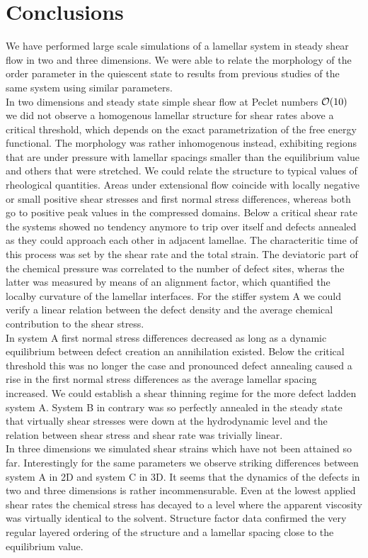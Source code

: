 \documentclass[8.5pt,twoside,twocolumn]{article}
\begin{document}
\section{Conclusions}
We have performed large scale simulations of a lamellar system in steady shear flow  in two and three dimensions.
We were able to relate the morphology of the order parameter in the quiescent state to results from previous studies of the same system using similar parameters.\\
In two dimensions and steady state simple shear flow at Peclet numbers ${\cal O}(10)$ we did not observe a homogenous lamellar structure for shear rates above a critical threshold, which depends on the exact parametrization of the free energy functional.
The morphology was rather inhomogenous instead, exhibiting regions that are under pressure with lamellar spacings smaller than the equilibrium value and others that were stretched.
We could relate the structure to typical values of rheological quantities.
Areas under extensional flow coincide with locally negative or small positive shear stresses and first normal stress differences, whereas both go to positive peak values in the compressed domains.
Below a critical shear rate the systems showed no tendency anymore to trip over itself and defects annealed as they could approach each other in adjacent lamellae.
The characteritic time of this process was set by the shear rate and the total strain.
The deviatoric part of the chemical pressure was correlated to the number of defect sites, wheras the latter was measured by means of an alignment factor, which quantified the localby curvature of the lamellar interfaces.
For the stiffer system A we could verify a linear relation between the defect density and the average chemical contribution to the shear stress.\\ 
In system A first normal stress differences decreased as long as a dynamic equilibrium between defect creation an annihilation existed.
Below the critical threshold this was no longer the case and pronounced defect annealing caused a rise in the first normal stress differences as the average lamellar spacing increased.
We could establish a shear thinning regime for the more defect ladden system A.
System B in contrary was so perfectly annealed in the steady state that virtually shear stresses were down at the hydrodynamic level and the relation between shear stress and shear rate was trivially linear.\\
In three dimensions we simulated shear strains which have not been attained so far.
Interestingly for the same parameters we observe striking differences between system A in 2D and system C in 3D.
It seems that the dynamics of the defects in two and three dimensions is rather incommensurable.
Even at the lowest applied shear rates the chemical stress has decayed to a level where the apparent viscosity was virtually identical to the solvent.
Structure factor data confirmed the very regular layered ordering of the structure and a lamellar spacing close to the equilibrium value. 
\end{document}
